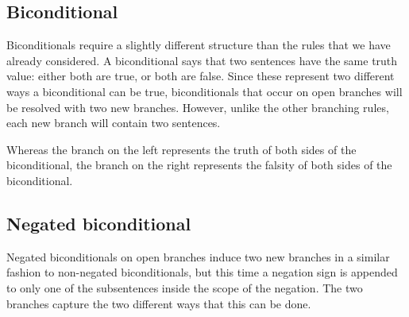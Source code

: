 \subsection{Biconditional}

Biconditionals require a slightly different structure than the rules that we have already considered.
A biconditional says that two sentences have the same truth value: either both are true, or both are false.
Since these represent two different ways a biconditional can be true, biconditionals that occur on open branches will be resolved with two new branches.
However, unlike the other branching rules, each new branch will contain two sentences.


Whereas the branch on the left represents the truth of both sides of the biconditional, the branch on the right represents the falsity of both sides of the biconditional.





\subsection{Negated biconditional}
\begin{groupitems}

Negated biconditionals on open branches induce two new branches in a similar fashion to non-negated biconditionals, but this time a negation sign is appended to only one of the subsentences inside the scope of the negation.
The two branches capture the two different ways that this can be done.

\end{groupitems}





